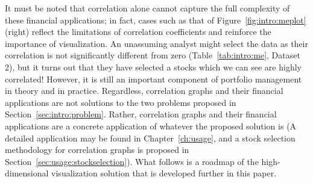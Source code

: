 It must be noted that correlation alone cannot capture the full complexity of 
these financial applications; in fact, cases such as that of 
Figure~\ref{fig:intro:meplot} (right) reflect the limitations of correlation 
coefficients and reinforce the importance of visualization. An unassuming 
analyst might select the data as their correlation is not significantly 
different from zero (Table~\ref{tab:intro:me}, Dataset 2), but it turns out 
that they have selected a stocks which we can see are highly correlated!
However, it is still an important component of 
portfolio management in theory and in practice. Regardless, correlation graphs 
and their financial applications are not solutions to the two problems proposed 
in Section~\ref{sec:intro:problem}. Rather, correlation graphs and their 
financial applications are a concrete application of whatever the proposed 
solution is (A detailed application may be found in Chapter~\ref{ch:usage}, and 
a stock selection methodology for correlation graphs is proposed in 
Section~\ref{sec:usage:stockselection}). What follows is a roadmap of the 
high-dimensional visualization solution that is developed further in this 
paper. 